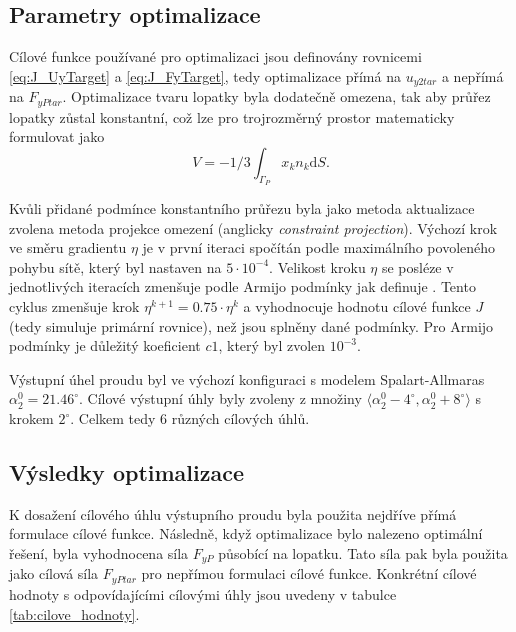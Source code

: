 \subsection{Parametry optimalizace}
Cílové funkce používané pro optimalizaci jsou definovány rovnicemi \ref{eq:J_UyTarget} a \ref{eq:J_FyTarget}, tedy optimalizace přímá na $ u_{y2tar} $ a nepřímá na $ F_{yPtar} $. Optimalizace tvaru lopatky byla dodatečně omezena, tak aby průřez lopatky zůstal konstantní, což lze pro trojrozměrný prostor matematicky formulovat jako
\begin{equation} 
V=-1/3\int_{\Gamma_P}x_kn_k\mathrm{d}S.
\end{equation}

Kvůli přidané podmínce konstantního průřezu byla jako metoda aktualizace zvolena metoda projekce omezení (anglicky \textit{constraint projection}). Výchozí krok ve směru gradientu $ \eta $ je v první iteraci spočítán podle maximálního povoleného pohybu sítě, který byl nastaven na $ 5\cdot10^{-4} $. Velikost kroku $ \eta $ se posléze v jednotlivých iteracích zmenšuje podle Armijo podmínky jak definuje \cite{nocedal1999numerical}. Tento cyklus zmenšuje krok $ \eta^{k+1}=0.75\cdot\eta^{k} $ a vyhodnocuje hodnotu cílové funkce $ J $ (tedy simuluje primární rovnice), než jsou splněny dané podmínky. Pro Armijo podmínky je důležitý koeficient $ c1 $, který byl zvolen $ 10^{-3} $.

Výstupní úhel proudu byl ve výchozí konfiguraci s modelem Spalart-Allmaras $ \alpha_{2}^{0}=21.46^{\circ} $. Cílové výstupní úhly byly zvoleny z množiny $ \langle \alpha_{2}^{0}-4^{\circ}, \alpha_{2}^{0}+8^{\circ} \rangle $ s krokem $ 2^{\circ} $. Celkem tedy 6 různých cílových úhlů.

\subsection{Výsledky optimalizace} \label{sec:vysledky_opt}
K dosažení cílového úhlu výstupního proudu byla použita nejdříve přímá formulace cílové funkce. Následně, když optimalizace bylo nalezeno optimální řešení, byla vyhodnocena síla $ F_{yP} $ působící na lopatku. Tato síla pak byla použita jako cílová síla $ F_{yPtar} $ pro nepřímou formulaci cílové funkce. Konkrétní cílové hodnoty s odpovídajícími cílovými úhly jsou uvedeny v tabulce \ref{tab:cilove_hodnoty}.

